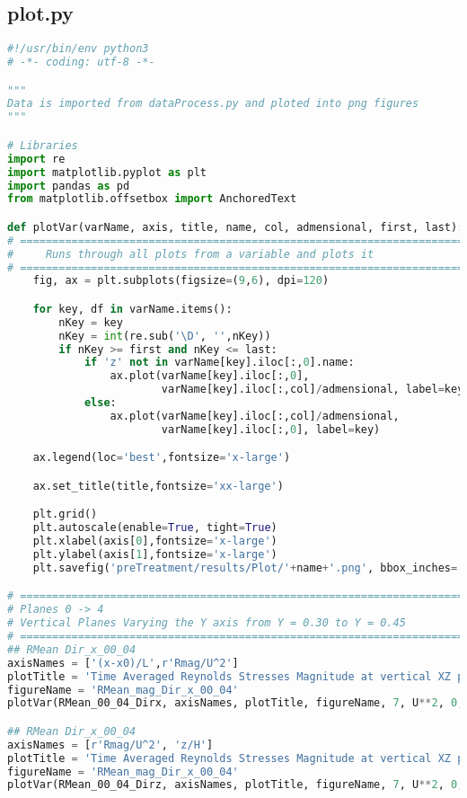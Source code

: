 \subsection{plot.py}
\begin{lstlisting}[language=python]
#!/usr/bin/env python3
# -*- coding: utf-8 -*-

"""
Data is imported from dataProcess.py and ploted into png figures
"""

# Libraries
import re
import matplotlib.pyplot as plt
import pandas as pd
from matplotlib.offsetbox import AnchoredText

def plotVar(varName, axis, title, name, col, admensional, first, last):
# =============================================================================
#     Runs through all plots from a variable and plots it
# =============================================================================
    fig, ax = plt.subplots(figsize=(9,6), dpi=120)

    for key, df in varName.items():
        nKey = key
        nKey = int(re.sub('\D', '',nKey))
        if nKey >= first and nKey <= last:
            if 'z' not in varName[key].iloc[:,0].name:
                ax.plot(varName[key].iloc[:,0],
                        varName[key].iloc[:,col]/admensional, label=key)
            else:
                ax.plot(varName[key].iloc[:,col]/admensional,
                        varName[key].iloc[:,0], label=key)

    ax.legend(loc='best',fontsize='x-large')

    ax.set_title(title,fontsize='xx-large')

    plt.grid()
    plt.autoscale(enable=True, tight=True)
    plt.xlabel(axis[0],fontsize='x-large')
    plt.ylabel(axis[1],fontsize='x-large')
    plt.savefig('preTreatment/results/Plot/'+name+'.png', bbox_inches='tight')

# =============================================================================
# Planes 0 -> 4
# Vertical Planes Varying the Y axis from Y = 0.30 to Y = 0.45
# =============================================================================
## RMean Dir_x_00_04
axisNames = ['(x-x0)/L',r'Rmag/U^2']
plotTitle = 'Time Averaged Reynolds Stresses Magnitude at vertical XZ planes'
figureName = 'RMean_mag_Dir_x_00_04'
plotVar(RMean_00_04_Dirx, axisNames, plotTitle, figureName, 7, U**2, 0, 4)

## RMean Dir_x_00_04
axisNames = [r'Rmag/U^2', 'z/H']
plotTitle = 'Time Averaged Reynolds Stresses Magnitude at vertical XZ planes'
figureName = 'RMean_mag_Dir_x_00_04'
plotVar(RMean_00_04_Dirz, axisNames, plotTitle, figureName, 7, U**2, 0, 4)


\end{lstlisting}
